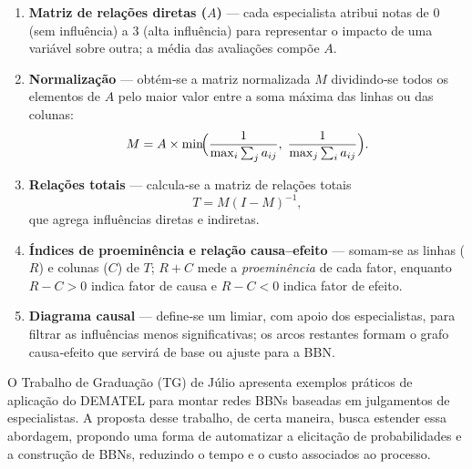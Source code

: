 \begin{enumerate}
  \item \textbf{Matriz de relações diretas ($A$)} — cada especialista atribui notas de $0$ (sem influência) a $3$ (alta influência) para representar o impacto de uma variável sobre outra; a média das avaliações compõe $A$.
  \item \textbf{Normalização} — obtém‑se a matriz normalizada $M$ dividindo‑se todos os elementos de $A$ pelo maior valor entre a soma máxima das linhas ou das colunas:
  \begin{equation}
    M = A \times \min\!\Bigl(\frac{1}{\max_i \sum_j a_{ij}},\; \frac{1}{\max_j \sum_i a_{ij}}\Bigr).
  \end{equation}
  \item \textbf{Relações totais} — calcula‑se a matriz de relações totais
  \begin{equation}
    T = M \left(I - M\right)^{-1},
  \end{equation}
  que agrega influências diretas e indiretas.
  \item \textbf{Índices de proeminência e relação causa–efeito} — somam‑se as linhas ($R$) e colunas ($C$) de $T$; $R+C$ mede a \emph{proeminência} de cada fator, enquanto $R-C>0$ indica fator de causa e $R-C<0$ indica fator de efeito.
  \item \textbf{Diagrama causal} — define‑se um limiar, com apoio dos especialistas, para filtrar as influências menos significativas; os arcos restantes formam o grafo causa‑efeito que servirá de base ou ajuste para a BBN.
\end{enumerate}

O Trabalho de Graduação (TG) de Júlio \cite{tgJulio} apresenta exemplos práticos de aplicação do DEMATEL para montar redes BBNs baseadas em julgamentos de especialistas. A proposta desse trabalho, de certa maneira, busca estender essa abordagem, propondo uma forma de automatizar a elicitação de probabilidades e a construção de BBNs, reduzindo o tempo e o custo associados ao processo.